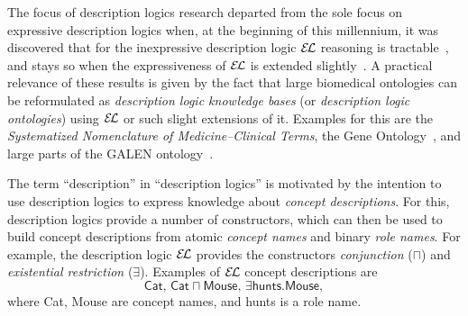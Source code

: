 The focus of description logics research departed from the sole focus on expressive
description logics when, at the beginning of this millennium, it was discovered that for
the inexpressive description logic ${\mathcal{E}\kern-.3ex\mathcal{L}}$ reasoning is
tractable~\cite{DBLP:conf/ijcai/Baader03a,DBLP:conf/ecai/Brandt04}, and stays so when the
expressiveness of ${\mathcal{E}\kern-.3ex\mathcal{L}}$ is extended
slightly~\cite{DBLP:conf/ijcai/BaaderBL05,BaaderEtAl-OWLED08DC}.  A practical relevance of
these results is given by the fact that large biomedical ontologies can be reformulated as
\emph{description logic knowledge bases} (or \emph{description logic ontologies}) using
${\mathcal{E}\kern-.3ex\mathcal{L}}$ or such slight extensions of it.  Examples for this are the \emph{Systematized
  Nomenclature of Medicine--Clinical Terms}, the Gene Ontology~\cite{gene-ontology}, and
large parts of the GALEN ontology~\cite{Rector199475}.

The term \enquote{description} in \enquote{description logics} is motivated by the
intention to use description logics to express knowledge about \emph{concept
  descriptions}.  For this, description logics provide a number of constructors, which can
then be used to build concept descriptions from atomic \emph{concept names} and binary
\emph{role names}.  For example, the description logic ${\mathcal{E}\kern-.3ex\mathcal{L}}$ provides the constructors
\emph{conjunction} ($\sqcap$) and \emph{existential restriction} ($\exists$).  Examples of
${\mathcal{E}\kern-.3ex\mathcal{L}}$ concept descriptions are
\begin{equation*}
  \mathsf{Cat},\, \mathsf{Cat} \sqcap \mathsf{Mouse},\, \exists \mathsf{hunts}. \mathsf{Mouse},
\end{equation*}
where \textsf{Cat}, \textsf{Mouse} are concept names, and \textsf{hunts} is a role name.

